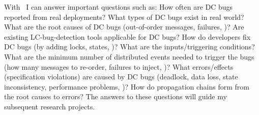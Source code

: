 With \taxdc\, I can answer important questions such as: How often are DC bugs
reported from real deployments? What types of DC bugs exist in real world?
What are the root causes of DC bugs (out-of-order messages, failures, \etc)?
Are existing LC-bug-detection tools applicable for DC bugs? How do developers
fix DC bugs (by adding locks, states, \etc)? What are the inputs/triggering
conditions?  What are the minimum number of distributed events needed to
trigger the bugs (how many messages to re-order, failures to inject, \etc)?
What errors/effects (specification violations) are caused by DC bugs (deadlock,
data loss, state inconsistency, performance problems, \etc)? How do propagation
chains form from the root causes to errors? The answers to these questions will
guide my subsequent research projects.

